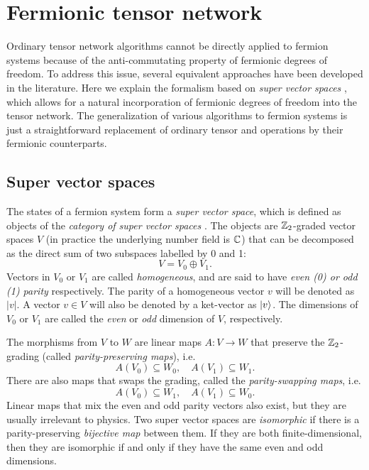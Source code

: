 \documentclass[11pt]{article}
\begin{document}
\section{Fermionic tensor network}
\label{sec:fermionic-tensors}

Ordinary tensor network algorithms cannot be directly applied to fermion systems because of the anti-commutating property of fermionic degrees of freedom. 
To address this issue, several equivalent approaches have been developed in the literature. 
Here we explain the formalism based on \emph{super vector spaces} \cite{Bultinck2017,Bultinck20172,Mortier2024}, which allows for a natural incorporation of fermionic degrees of freedom into the tensor network. 
The generalization of various algorithms to fermion systems is just a straightforward replacement of ordinary tensor and operations by their fermionic counterparts.

\subsection{Super vector spaces} 

The states of a fermion system form a \emph{super vector space}, which is defined as objects of the \emph{category of super vector spaces} \cite{Varadarajan2004}.
The objects are $\mathbb{Z}_2$-graded vector spaces $V$ (in practice the underlying number field is $\mathbb{C}$) that can be decomposed as the direct sum of two subspaces labelled by 0 and 1:
\begin{equation}
    V = V_0 \oplus V_1.
\end{equation}
Vectors in $V_0$ or $V_1$ are called \emph{homogeneous}, and are said to have \emph{even (0) or odd (1) parity} respectively. The parity of a homogeneous vector $v$ will be denoted as $|v|$. A vector $v \in V$ will also be denoted by a ket-vector as $\ket{v}$. 
The dimensions of $V_0$ or $V_1$ are called the \emph{even} or \emph{odd} dimension of $V$, respectively. 
    
The morphisms from $V$ to $W$ are linear maps $A: V \to W$ that preserve the $\mathbb{Z}_2$-grading (called \emph{parity-preserving maps}), i.e. 
\begin{equation}
    A(V_0) \subseteq W_0, \quad
    A(V_1) \subseteq W_1.
\end{equation} 
There are also maps that swaps the grading, called the \emph{parity-swapping maps}, i.e. 
\begin{equation}
    A(V_0) \subseteq W_1, \quad
    A(V_1) \subseteq W_0.
\end{equation} 
Linear maps that mix the even and odd parity vectors also exist, but they are usually irrelevant to physics. 
Two super vector spaces are \emph{isomorphic} if there is a parity-preserving \emph{bijective map} between them. If they are both finite-dimensional, then they are isomorphic if and only if they have the same even and odd dimensions. 
\end{document}
